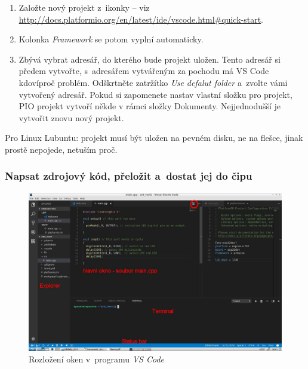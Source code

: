 \begin{enumerate}
\item Založte nový projekt z~ikonky  -- viz \url{http://docs.platformio.org/en/latest/ide/vscode.html\#quick-start}.
\item {}
Kolonka {\it Framework } se potom vyplní automaticky. 
\item  Zbývá vybrat adresář, do kterého bude projekt uložen.
Tento adresář si předem vytvořte, s~adresářem vytvářeným za pochodu má VS Code kdovíproč problém.
Odškrtněte zatržítko {\it Use defalut folder} a~zvolte vámi vytvořený adresář. Pokud si zapomenete nastav vlastní složku pro projekt, PIO projekt vytvoří někde v rámci složky Dokumenty. Nejjednodušší je vytvořit znovu nový projekt.
\end{enumerate}

Pro Linux Lubuntu: projekt musí být uložen na pevném disku, ne na flešce, jinak prostě nepojede, netuším proč.  

\subsubsection{Napsat zdrojový kód, přeložit a~dostat jej do čipu}

\begin{figure}[h]
	\includegraphics[width=\textwidth]{soubory/rozlozeni2.jpg}
	\caption{Rozložení oken v~programu {\it VS Code}} 
	\label{fig:vsc_rozlozeni}
\end{figure}	

